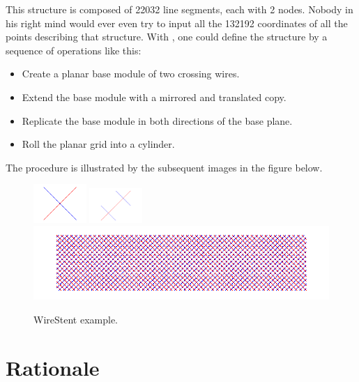 This structure is composed of 22032 line segments, each with 2 nodes. Nobody in his right mind would ever even try to input all the 132192 coordinates of all the points describing that structure. 
With \pyformex, one could define the structure by a sequence of operations like this:
 \begin{itemize}
 \item Create a planar base module of two crossing wires.
 \item Extend the base module with a mirrored and translated copy.
 \item Replicate the base module in both directions of the base plane.
 \item Roll the planar grid into a cylinder.
 \end{itemize}
 The procedure is illustrated by the subsequent images in the figure below.
 \begin{figure}[h]
   \centering
   \begin{makeimage}
   \end{makeimage}
   \begin{latexonly}
     \includegraphics[width=2cm]{images/wirestent-1}
     \includegraphics[width=2cm]{images/wirestent-2}
     \includegraphics[width=12cm]{images/wirestent-3}
   \end{latexonly}
   \begin{htmlonly}
   \end{htmlonly}  
   \label{fig:WireStent steps}
   \caption{WireStent example.}
 \end{figure}


\section{Rationale}
\label{sec:rationale}

